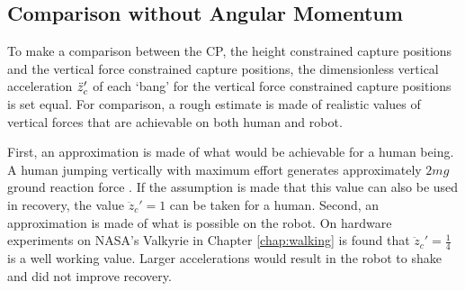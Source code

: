 \subsection{Comparison without Angular Momentum}\label{sec:capcomparenoinertia}
To make a comparison between the \ac{CP}, the height constrained capture positions and the vertical force constrained capture positions, the dimensionless vertical acceleration $\ddot{z}_{c}'$ of each `bang' for the vertical force constrained capture positions is set equal. For comparison, a rough estimate is made of realistic values of vertical forces that are achievable on both human and robot.

First, an approximation is made of what would be achievable for a human being. A human jumping vertically with maximum effort generates approximately $2mg$ ground reaction force \cite{linthorne2001analysis}. If the assumption is made that this value can also be used in recovery, the value $\ddot{z}_c'=1$ can be taken for a human. Second, an approximation is made of what is possible on the robot. On hardware experiments on NASA's Valkyrie in Chapter \ref{chap:walking} is found that $\ddot{z}_c'=\frac{1}{4}$ is a well working value. Larger accelerations would result in the robot to shake and did not improve recovery. 

